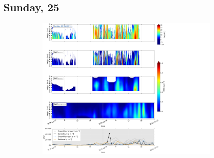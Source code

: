 \subsection{Sunday, \SI{25}{\dec}}
\label{sec:vertEM09:2512}
\begin{figure}[t]
	\centering
	\begin{subfigure}[t]{\textwidth}
		\includegraphics[trim={0.4cm .4cm 31.3cm 63.5cm},clip,width=\textwidth]{./fig_SWC/20161225}
	\end{subfigure}
	\caption{}\label{fig:SWP25}
\end{figure}
%
